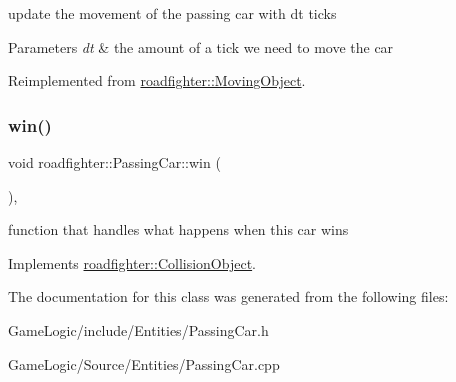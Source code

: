 update the movement of the passing car with dt ticks 
\begin{DoxyParams}{Parameters}
{\em dt} & the amount of a tick we need to move the car \\
\hline
\end{DoxyParams}


Reimplemented from \hyperlink{classroadfighter_1_1MovingObject_ac1918d96dac118c4bd7d99168d92867c}{roadfighter\+::\+Moving\+Object}.

\mbox{\label{classroadfighter_1_1PassingCar_a365d8befb1c2fd34337fc25665ccc73f}} 
\subsubsection{\texorpdfstring{win()}{win()}}
{\footnotesize\ttfamily void roadfighter\+::\+Passing\+Car\+::win (\begin{DoxyParamCaption}{ }\end{DoxyParamCaption})\hspace{0.3cm}{\ttfamily [override]}, {\ttfamily [virtual]}}

function that handles what happens when this car wins 

Implements \hyperlink{classroadfighter_1_1CollisionObject_a03ce1ae52676088839d85c597743052c}{roadfighter\+::\+Collision\+Object}.



The documentation for this class was generated from the following files\+:\begin{DoxyCompactItemize}
\item 
Game\+Logic/include/\+Entities/Passing\+Car.\+h\item 
Game\+Logic/\+Source/\+Entities/Passing\+Car.\+cpp\end{DoxyCompactItemize}
